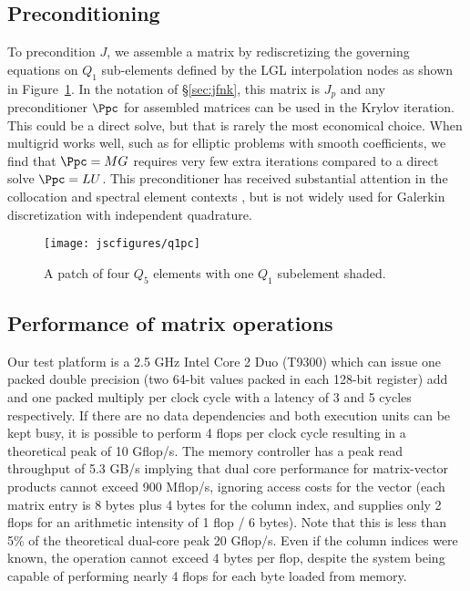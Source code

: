 \subsection{Preconditioning}\label{sec:preconditioning}
To precondition $J$, we assemble a matrix by rediscretizing the governing equations on $Q_1$ sub-elements defined by the
LGL interpolation nodes as shown in Figure~\ref{fig:q1pc}.  In the notation of \S\ref{sec:jfnk}, this matrix is $J_p$
and any preconditioner $\Ppc$ for assembled matrices can be used in the Krylov iteration.  This could be a direct solve,
but that is rarely the most economical choice.  When multigrid works well, such as for elliptic problems with smooth
coefficients, we find that $\Ppc = MG$ requires very few extra iterations compared to a direct solve $\Ppc = LU$.  This
preconditioner has received substantial attention in the collocation and spectral element contexts
\citep[\eg][]{orszag1980smp,deville1985cps,deville1990fep,heys2005amh,kim2007pbp}, but is not widely used for Galerkin
discretization with independent quadrature.

\begin{figure}
  \centering\texttt{[image: jscfigures/q1pc]}
  \caption{A patch of four $Q_5$ elements with one $Q_1$ subelement shaded.}\label{fig:q1pc}
\end{figure}

\subsection{Performance of matrix operations}\label{sec:mat-perf}
Our test platform is a 2.5 GHz Intel Core 2 Duo (T9300) which can issue one packed double precision (two 64-bit values
packed in each 128-bit register) add and one packed multiply per clock cycle with a latency of 3 and 5 cycles
respectively.  If there are no data dependencies and both execution units can be kept busy, it is possible to perform 4
flops per clock cycle resulting in a theoretical peak of 10 Gflop/s.  The memory controller has a peak read throughput
of 5.3 GB/s implying that dual core performance for matrix-vector products cannot exceed 900 Mflop/s, ignoring access
costs for the vector (each matrix entry is 8 bytes plus 4 bytes for the column index, and supplies only 2 flops for an
arithmetic intensity of 1 flop / 6 bytes).  Note that this is less than 5\% of the theoretical dual-core peak 20
Gflop/s.  Even if the column indices were known, the operation cannot exceed 4 bytes per flop, despite the system being
capable of performing nearly 4 flops for each byte loaded from memory.

